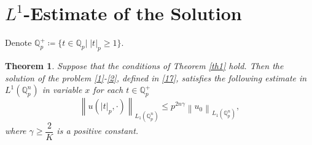 \documentclass[14pt]{article}
\newcommand{\norm}[1]{\left\lVert#1\right\rVert}
\theoremstyle{theorem}
\newtheorem{theorem}{Theorem}[section]
\theoremstyle{theorem}
\theoremstyle{definition}
\theoremstyle{lemma}
\newcommand{\Label}[1]{\label{#1}}
\numberwithin{equation}{section}
\begin{document}
\section{$L^1$-Estimate of the Solution}

Denote $\mathbb{Q}_p^+\coloneqq\{t\in\mathbb{Q}_p|\;|t|_p\geq1\}$.

\begin{theorem}\Label{th3}
Suppose that the conditions of Theorem \ref{th1} hold. Then the solution of the problem \eqref{1}-\eqref{2}, defined in \eqref{17}, satisfies the following estimate in $L^1(\mathbb{Q}_p^n)$ in variable $x$ for each $t\in\mathbb{Q}_p^+$
 \begin{equation}\Label{31.5}
\norm{u(|t|_p,\cdot)}_{L_1(\mathbb{Q}_p^n)}\leq p^{2n\gamma}\norm{u_0}_{L_1(\mathbb{Q}_p^n)},
\end{equation}
where $\gamma\geq\dfrac{2}{K}$ is a positive constant.
\end{theorem}
\end{document}
